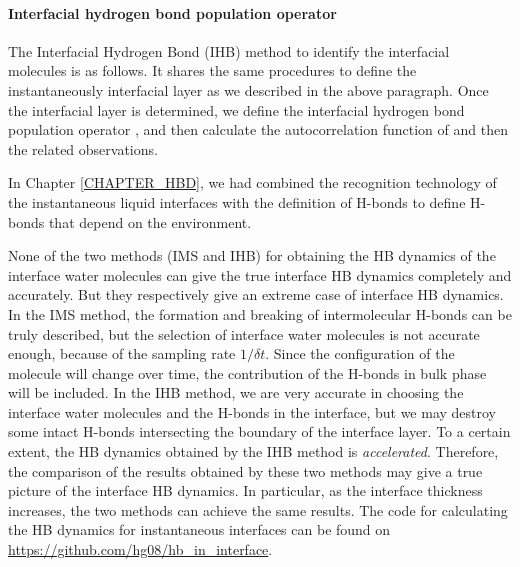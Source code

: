 \paragraph{Interfacial hydrogen bond population operator \hbos} 
The Interfacial Hydrogen Bond (IHB) method to identify the interfacial molecules is as follows. 
It shares the same procedures to define the instantaneously interfacial layer as we described in the above paragraph.
Once the interfacial layer is determined, we define the interfacial hydrogen bond population operator \hbos,
and then calculate the autocorrelation function of \hbos and then the related observations. 

In Chapter \ref{CHAPTER_HBD}, we had combined the recognition technology of the instantaneous liquid interfaces\cite{Willard2010} 
with the definition of H-bonds\cite{AL96b,Luzar1996} to define H-bonds that depend on the environment. 

None of the two methods (IMS and IHB) for obtaining the HB dynamics of the interface water molecules 
can give the true interface HB dynamics completely and accurately. But they respectively give an extreme case of interface HB dynamics. 
In the IMS method, the formation and breaking of intermolecular H-bonds can be truly described, 
but the selection of interface water molecules is not accurate enough, because of the sampling rate $1/{\delta t}$. 
Since the configuration of the molecule will change over time, 
the contribution of the H-bonds in bulk phase will be included. 
In the IHB method, we are very accurate in choosing the interface water molecules and the H-bonds in the interface, 
but we may destroy some intact H-bonds intersecting the boundary of the interface layer. 
To a certain extent, the HB dynamics obtained by the IHB method is \emph{accelerated}. 
Therefore, the comparison of the results obtained by these two methods may give a true picture of the interface HB dynamics.
In particular, as the interface thickness increases, the two methods can achieve the same results.
The code for calculating the HB dynamics for instantaneous interfaces can be found on \url{https://github.com/hg08/hb_in_interface}. 

